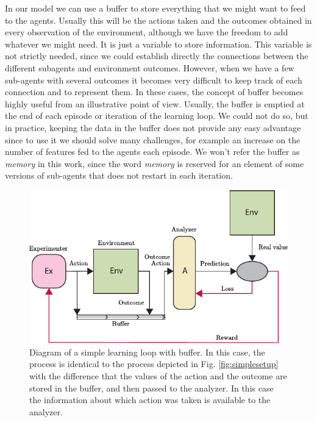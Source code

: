 \documentclass[11pt,a4paper,twoside]{report}
\newcommand{\+}{\textnormal{+} }
\theoremstyle{definition}
\numberwithin{equation}{chapter}
\begin{document}
In our model we can use a buffer to store everything that we might want to feed
to the agents. Usually this will be the actions taken and the outcomes obtained
in every observation of the environment, although we have the freedom to add
whatever we might need. It is just a variable to store information. This
variable is not strictly needed, since we could establish directly the
connections between the different subagents and environment outcomes. However,
when we have a few sub-agents with several outcomes it becomes very difficult to
keep track of each connection and to represent them. In these cases, the concept
of buffer becomes highly useful from an illustrative point of view. Usually, the
buffer is emptied at the end of each episode or iteration of the learning loop.
We could not do so, but in practice, keeping the data in the buffer does not
provide any easy advantage since to use it we should solve many challenges, for
example an increase on the number of features fed to the agents each episode.
We won't refer the buffer as \textit{memory} in this work, since the word
\textit{memory} is reserved for an element of some versions of sub-agents that
does not restart in each iteration. 


\begin{figure}
  \centering
  \includegraphics{figures/SimpleSetUp(Buffer).pdf}
  \caption{Diagram of a simple learning loop with buffer. In this case, the
  process is identical to the process depicted in Fig. \ref{fig:simplesetup}
  with the difference that the values of the action and the outcome are stored
  in the buffer, and then passed to the analyzer. In this case the information
  about which action was taken is available to the analyzer.} 
  \label{fig:simplesetupbuffer}
\end{figure}
\end{document}
